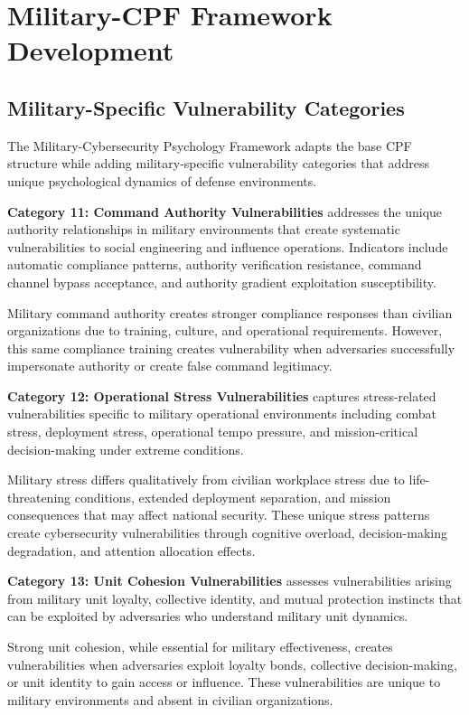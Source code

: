 \documentclass[10pt, twocolumn]{article}
\begin{document}
\section{Military-CPF Framework Development}

\subsection{Military-Specific Vulnerability Categories}

The Military-Cybersecurity Psychology Framework adapts the base CPF structure while adding military-specific vulnerability categories that address unique psychological dynamics of defense environments.

\textbf{Category 11: Command Authority Vulnerabilities} addresses the unique authority relationships in military environments that create systematic vulnerabilities to social engineering and influence operations. Indicators include automatic compliance patterns, authority verification resistance, command channel bypass acceptance, and authority gradient exploitation susceptibility.

Military command authority creates stronger compliance responses than civilian organizations due to training, culture, and operational requirements. However, this same compliance training creates vulnerability when adversaries successfully impersonate authority or create false command legitimacy.

\textbf{Category 12: Operational Stress Vulnerabilities} captures stress-related vulnerabilities specific to military operational environments including combat stress, deployment stress, operational tempo pressure, and mission-critical decision-making under extreme conditions.

Military stress differs qualitatively from civilian workplace stress due to life-threatening conditions, extended deployment separation, and mission consequences that may affect national security. These unique stress patterns create cybersecurity vulnerabilities through cognitive overload, decision-making degradation, and attention allocation effects.

\textbf{Category 13: Unit Cohesion Vulnerabilities} assesses vulnerabilities arising from military unit loyalty, collective identity, and mutual protection instincts that can be exploited by adversaries who understand military unit dynamics.

Strong unit cohesion, while essential for military effectiveness, creates vulnerabilities when adversaries exploit loyalty bonds, collective decision-making, or unit identity to gain access or influence. These vulnerabilities are unique to military environments and absent in civilian organizations.
\end{document}
